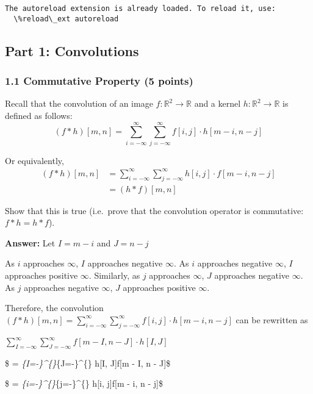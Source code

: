 \documentclass[11pt]{article}
\begin{document}
    \begin{Verbatim}[commandchars=\\\{\}]
The autoreload extension is already loaded. To reload it, use:
  \%reload\_ext autoreload
    \end{Verbatim}

    \hypertarget{part-1-convolutions}{%
\subsection{Part 1: Convolutions}\label{part-1-convolutions}}

\hypertarget{commutative-property-5-points}{%
\subsubsection{1.1 Commutative Property (5
points)}\label{commutative-property-5-points}}

Recall that the convolution of an image
\(f:\mathbb{R}^2\rightarrow \mathbb{R}\) and a kernel
\(h:\mathbb{R}^2\rightarrow\mathbb{R}\) is defined as follows:
\[(f*h)[m,n]=\sum_{i=-\infty}^\infty\sum_{j=-\infty}^\infty f[i,j]\cdot h[m-i,n-j]\]

Or equivalently, \begin{align}
(f*h)[m,n] &= \sum_{i=-\infty}^\infty\sum_{j=-\infty}^\infty h[i,j]\cdot f[m-i,n-j]\\
&= (h*f)[m,n]
\end{align}

Show that this is true (i.e.~prove that the convolution operator is
commutative: \(f*h = h*f\)).

    \textbf{Answer:} Let \(I = m - i\) and \(J = n - j\)

As \(i\) approaches \(\infty\), \(I\) approaches negative \(\infty\). As
\(i\) approaches negative \(\infty\), \(I\) approaches positive
\(\infty\). Similarly, as \(j\) approaches \(\infty\), \(J\) approaches
negative \(\infty\). As \(j\) approaches negative \(\infty\), \(J\)
approaches positive \(\infty\).

Therefore, the convolution
\((f * h)[m, n] = \sum_{i=-\infty}^{\infty}\sum_{j=-\infty}^{\infty}f[i, j] \cdot h[m - i, n - j]\)
can be rewritten as

\(\sum_{I=-\infty}^{\infty}\sum_{J=-\infty}^{\infty}f[m - I, n - J] \cdot h[I, J]\)

\$ =
\sum\emph{\{I=-\infty\}\^{}\{\infty\}\sum}\{J=-\infty\}\^{}\{\infty\}
h{[}I, J{]}\cdot f{[}m - I, n - J{]}\$

\$ =
\sum\emph{\{i=-\infty\}\^{}\{\infty\}\sum}\{j=-\infty\}\^{}\{\infty\}
h{[}i, j{]}\cdot f{[}m - i, n - j{]}\$
\end{document}
